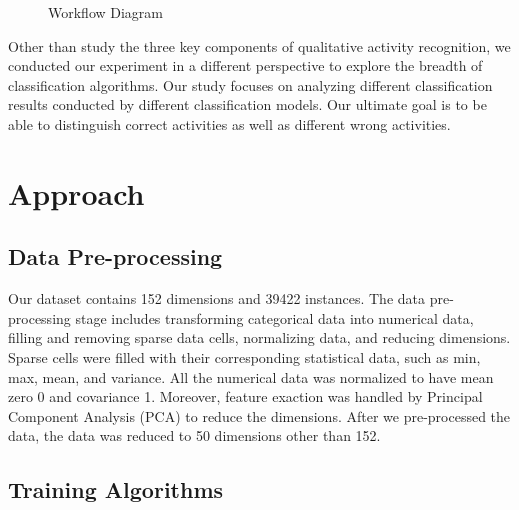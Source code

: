 \documentclass{article} %
\begin{document}
\begin{figure}[hbt]
\begin{center}
\end{center}
\caption{Workflow Diagram}
\end{figure}

Other than study the three key components of qualitative activity recognition, we conducted our experiment in a different perspective to explore the breadth of classification algorithms. Our study focuses on analyzing different classification results conducted by different classification models. Our ultimate goal is to be able to distinguish correct activities as well as different wrong activities.

\section{Approach}

\subsection{Data Pre-processing}

Our dataset contains 152 dimensions and 39422 instances. The data pre-processing stage includes transforming categorical data into numerical data, filling and removing sparse data cells, normalizing data, and reducing dimensions. Sparse cells were filled with their corresponding statistical data, such as min, max, mean, and variance. All the numerical data was normalized to have mean zero 0 and covariance 1. Moreover, feature exaction was handled by Principal Component Analysis (PCA) to reduce the dimensions. After we pre-processed the data, the data was reduced to 50 dimensions other than 152.

\subsection{Training Algorithms}
\end{document}
